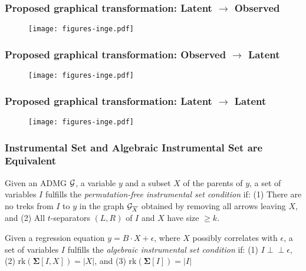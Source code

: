 \documentclass{beamer}
\def\ci{\perp\!\!\!\!\!\perp}
\begin{document}
\begin{frame}
	\frametitle{Proposed graphical transformation: Latent $ \rightarrow $ Observed}
	\begin{figure}
		\centering
		\texttt{[image: figures-inge.pdf]}
		\caption{}
		\label{fig:l2o_parent}
	\end{figure}
\end{frame}
\begin{frame}
	\frametitle{Proposed graphical transformation: Observed $ \rightarrow $ Latent}
	\begin{figure}
		\centering
		\texttt{[image: figures-inge.pdf]}
		\caption{}
		\label{fig:l2o_child}
	\end{figure}
\end{frame}
\begin{frame}
	\frametitle{Proposed graphical transformation: Latent $ \rightarrow $ Latent}
	\begin{figure}
		\centering
		\texttt{[image: figures-inge.pdf]}
		\caption{}
		\label{fig:l2o_both}
	\end{figure}
\end{frame}

\begin{frame}
	\frametitle{Instrumental Set and Algebraic Instrumental Set are Equivalent}
		\begin{definition}
		\label{defn:graphicistrek}
			Given an ADMG $\cal G$, a variable $y$ and a subset $X$ of the parents
			of $y$, a set of variables $I$ fulfills the \emph{permutation-free
			instrumental set condition} if: (1) There are no treks from $I$ to $y$
			in the graph ${\cal G}_{\overline{X}}$ obtained by removing all arrows
			leaving $X$, and (2) All $t$-separators $(L,R)$ of $I$ and $X$ have
			size $\geq k$. 
		\end{definition}

		\begin{definition}
			\label{defn:algebraicis}
			Given a regression equation $y = B \cdot X + \epsilon$, where $X$ possibly
			correlates with $\epsilon$, a set of variables
			$I$ fulfills the \emph{algebraic instrumental set condition} if: (1) $I \ci \epsilon$,
			(2) $\textrm{rk}(\bm{\Sigma}[I,X]) = |X|$, and (3) $\textrm{rk}(\bm{\Sigma}[I]) = |I|$
		\end{definition}
\end{frame}
\end{document}
